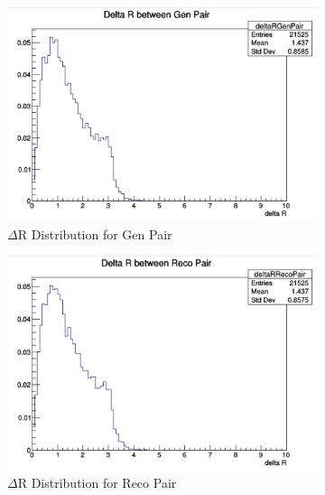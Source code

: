 \documentclass{article}
\begin{document}
\par
\begin{figure} [H]
\begin{subfigure}{.5\textwidth}
  \centering
  \includegraphics[width=.8\linewidth]{GenMuonsDeltaR.png}  
  \caption{$\Delta$R Distribution for Gen Pair}
  \label{fig:sub-first3}
\end{subfigure}
\begin{subfigure}{.5\textwidth}
  \centering
  \includegraphics[width=.8\linewidth]{dSAMuonsDeltaR.png}  
  \caption{$\Delta$R Distribution for Reco Pair}
  \label{fig:sub-second3}
\end{subfigure}
\caption{}
\label{fig:13}
\end{figure}
\par
\end{document}
